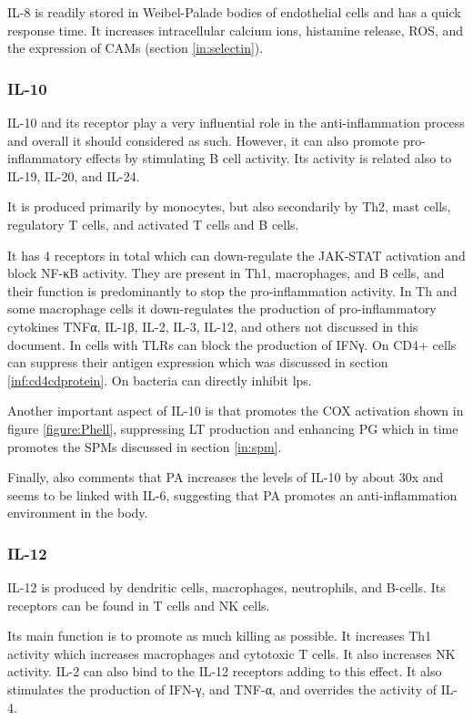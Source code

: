 IL-8 is readily stored in Weibel-Palade bodies of endothelial cells and has a quick response time. It increases intracellular calcium ions, histamine release, ROS, and the expression of CAMs (section \ref{in:selectin}).


\subsubsection{IL-10}
\label{in:IL10}

IL-10 and its receptor play a very influential role in the anti-inflammation process and overall it should considered as such. However, it can also promote pro-inflammatory effects by stimulating B cell activity. Its activity is related also to IL-19, IL-20, and IL-24.

It is produced primarily by monocytes, but also secondarily by Th2, mast cells, regulatory T cells, and activated T cells and B cells.

It has 4 receptors in total which can down-regulate the JAK-STAT activation and block NF-κB activity. They are present in Th1, macrophages, and B cells, and their function is predominantly to stop the pro-inflammation activity. In Th and some macrophage cells it down-regulates the production of pro-inflammatory cytokines TNFα, IL-1β, IL-2, IL-3, IL-12, and others not discussed in this document. In cells with TLRs can block the production of IFNγ. On CD4+ cells can suppress their antigen expression which was discussed in section \ref{inf:cd4cdprotein}. On bacteria can directly inhibit \gls{lps}.

Another important aspect of IL-10 is that promotes the COX activation shown in figure \ref{figure:Phell}, suppressing LT production and enhancing PG which in time promotes the SPMs discussed in section \ref{in:spm}.

Finally, also comments that PA increases the levels of IL-10 by about 30x \cite{Ostrowski1999} and seems to be linked with IL-6, suggesting that PA promotes an anti-inflammation environment in the body.

\subsubsection{IL-12}
\label{in:IL12}

IL-12 is produced by dendritic cells, macrophages, neutrophils, and B-cells. Its receptors can be found in T cells and NK cells.

Its main function is to promote as much killing as possible. It increases Th1 activity which increases macrophages and cytotoxic T cells. It also increases NK activity. IL-2 can also bind to the IL-12 receptors adding to this effect. It also stimulates the production of IFN-γ, and TNF-α, and overrides the activity of IL-4.


